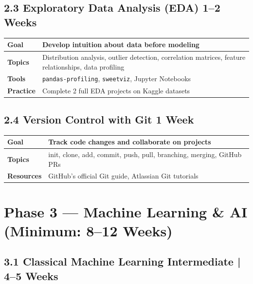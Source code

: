 \documentclass[a4paper,11pt]{article}
\begin{document}
\subsection{2.3 Exploratory Data Analysis (EDA) \hfill \small\normalfont\color{darkgray}1--2 Weeks}

\begin{tabular}{>{\bfseries}p{3cm} p{11.5cm}}
\toprule
Goal & Develop intuition about data before modeling \\
\midrule
Topics & Distribution analysis, outlier detection, correlation matrices, feature relationships, data profiling \\
Tools & \texttt{pandas-profiling}, \texttt{sweetviz}, Jupyter Notebooks \\
Practice & Complete 2 full EDA projects on Kaggle datasets \\
\bottomrule
\end{tabular}

\subsection{2.4 Version Control with Git \hfill \small\normalfont\color{darkgray}1 Week}

\begin{tabular}{>{\bfseries}p{3cm} p{11.5cm}}
\toprule
Goal & Track code changes and collaborate on projects \\
\midrule
Topics & init, clone, add, commit, push, pull, branching, merging, GitHub PRs \\
Resources & GitHub's official Git guide, Atlassian Git tutorials \\
\bottomrule
\end{tabular}

\section{Phase 3 — Machine Learning \& AI \hfill \small\normalfont\color{teal}(Minimum: 8--12 Weeks)}

\subsection{3.1 Classical Machine Learning \hfill \small\normalfont\color{darkgray}Intermediate | 4--5 Weeks}
\end{document}
